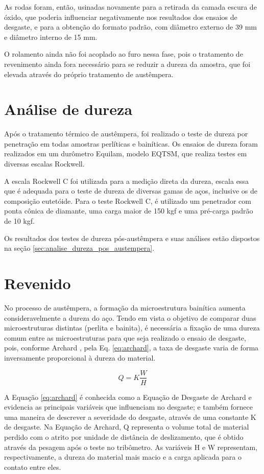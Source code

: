 \documentclass[
12pt,
openany, %
oneside, %
a4paper,			
english,			
brazil			        %
]{abntbibufjf}
\begin{document}
	As rodas foram, então, usinadas novamente para a retirada da camada escura de óxido, que poderia influenciar negativamente nos resultados dos ensaios de desgaste, e para a obtenção do formato padrão, com diâmetro externo de 39 mm e diâmetro interno de 15 mm.
	
	O rolamento ainda não foi acoplado ao furo nessa fase, pois o tratamento de revenimento ainda fora necessário para se reduzir a dureza da amostra, que foi elevada através do próprio tratamento de austêmpera.

\pagebreak	
\section{Análise de dureza}

	Após o tratamento térmico de austêmpera, foi realizado o teste de dureza por penetração em todas amostras perlíticas e bainíticas. Os ensaios de dureza foram realizados em um durômetro Equilam, modelo EQTSM, que realiza testes em diversas escalas Rockwell.
	
	A escala Rockwell C foi utilizada para a medição direta da dureza, escala essa que é adequada para o teste de dureza de diversas gamas de aços, inclusive os de composição eutetóide. Para o teste Rockwell C, é utilizado um penetrador com ponta cônica de diamante, uma carga maior de 150 kgf e uma pré-carga padrão de 10 kgf.
	
	Os resultados dos testes de dureza pós-austêmpera e suas análises estão dispostos na seção \ref{sec:analise_dureza_pos_austempera}.
	
	

\pagebreak	
\section{Revenido}
\label{sec:revenido}
	No processo de austêmpera, a formação da microestrutura bainítica aumenta consideravelmente a dureza do aço. Tendo em vista o objetivo de comparar duas microestruturas distintas (perlita e bainita), é necessária a fixação de uma dureza comum entre as microestruturas para que seja realizado o ensaio de desgaste, pois, conforme Archard \cite{archard1953contact}, pela Eq. \ref{eq:archard}, a taxa de desgaste varia de forma inversamente proporcional à dureza do material. 
	
	\begin{equation} \label{eq:archard}
	Q = K\frac{W}{H}
	\end{equation}
	
	A Equação \ref{eq:archard} é conhecida como a Equação de Desgaste de Archard e evidencia as principais variáveis que influenciam no desgaste; e também fornece uma maneira de descrever a severidade do desgaste, através de uma constante K de desgaste. Na Equação de Archard, Q representa o volume total de material perdido com o atrito por unidade de distância de deslizamento, que é obtido através da pesagem após o teste no tribômetro. As variáveis H e W representam, respectivamente, a dureza do material mais macio e a carga aplicada para o contato entre eles.
	
\end{document}
